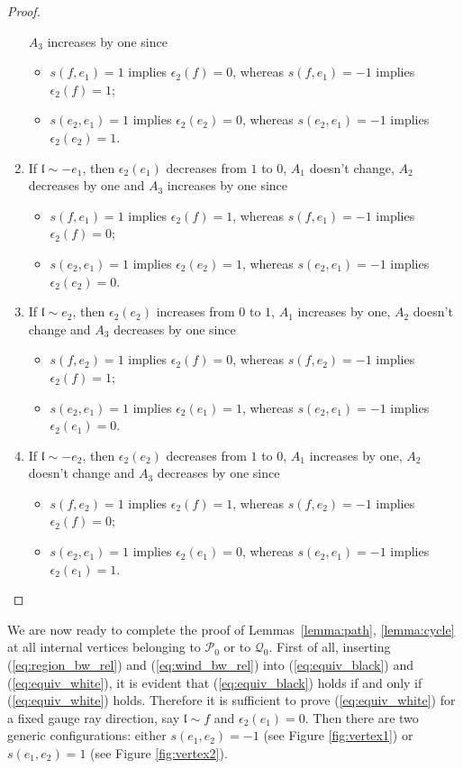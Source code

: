 \documentclass[11pt]{amsart}
\theoremstyle{plain}
\numberwithin{equation}{section}
\begin{document}
\begin{proof}
\begin{enumerate}
$A_3$ increases by one since
\begin{itemize}
\item $s(f,e_1)= 1$ implies $\epsilon_2(f)=0$, whereas $s(f,e_1)=-1$ implies $\epsilon_2(f)=1$;
\item $s(e_2,e_1)=1$ implies $\epsilon_2(e_2)=0$, whereas $s(e_2,e_1)=-1$ implies $\epsilon_2(e_2)=1$. 
\end{itemize}
\item If $\mathfrak{l}\sim -e_1$, then $\epsilon_2(e_1)$ decreases from $1$ to $0$, $A_1$ doesn't change, $A_2$ decreases by one and $A_3$ increases by one since
\begin{itemize}
\item $s(f,e_1)= 1$ implies $\epsilon_2(f)=1$, whereas $s(f,e_1)=-1$ implies $\epsilon_2(f)=0$;
\item $s(e_2,e_1)=1$ implies $\epsilon_2(e_2)=1$, whereas $s(e_2,e_1)=-1$ implies $\epsilon_2(e_2)=0$.
\end{itemize}
\item If $\mathfrak{l}\sim e_2$, then $\epsilon_2(e_2)$ increases from $0$ to $1$, $A_1$ increases by one, $A_2$ doesn't change and $A_3$ decreases by one since
\begin{itemize}
\item $s(f,e_2)= 1$ implies $\epsilon_2(f)=0$, whereas $s(f,e_2)=-1$ implies $\epsilon_2(f)=1$;
\item $s(e_2,e_1)=1$ implies $\epsilon_2(e_1)= 1$, whereas $s(e_2,e_1)=-1$ implies $\epsilon_2(e_1)= 0$. 
\end{itemize}
\item If $\mathfrak{l}\sim -e_2$, then $\epsilon_2(e_2)$ decreases from $1$ to $0$, $A_1$ increases by one, $A_2$ doesn't change and $A_3$ decreases by one since
\begin{itemize}
\item $s(f,e_2)= 1$ implies $\epsilon_2(f)=1$, whereas $s(f,e_2)=-1$ implies $\epsilon_2(f)=0$; 
\item $s(e_2,e_1)=1$ implies $\epsilon_2(e_1)= 0$, whereas $s(e_2,e_1)=-1$ implies $\epsilon_2(e_1)= 1$. 
\end{itemize}
\end{enumerate}
\end{proof}

We are now ready to complete the proof of Lemmas~\ref{lemma:path}, \ref{lemma:cycle} at all internal vertices belonging to $\mathcal P_0$ or to $\mathcal Q_0$. First of all, inserting (\ref{eq:region_bw_rel}) and (\ref{eq:wind_bw_rel}) into (\ref{eq:equiv_black}) and (\ref{eq:equiv_white}), it is evident that (\ref{eq:equiv_black}) holds if and only if (\ref{eq:equiv_white}) holds. Therefore it is sufficient to prove  
(\ref{eq:equiv_white}) for a fixed gauge ray direction, say $\mathfrak{l} \sim f$ and $\epsilon_2(e_1)=0$. Then there are two generic configurations: either $s(e_1,e_2)=-1$ (see Figure \ref{fig:vertex1}) or $s(e_1,e_2)=1$ (see Figure \ref{fig:vertex2}).
\end{document}
